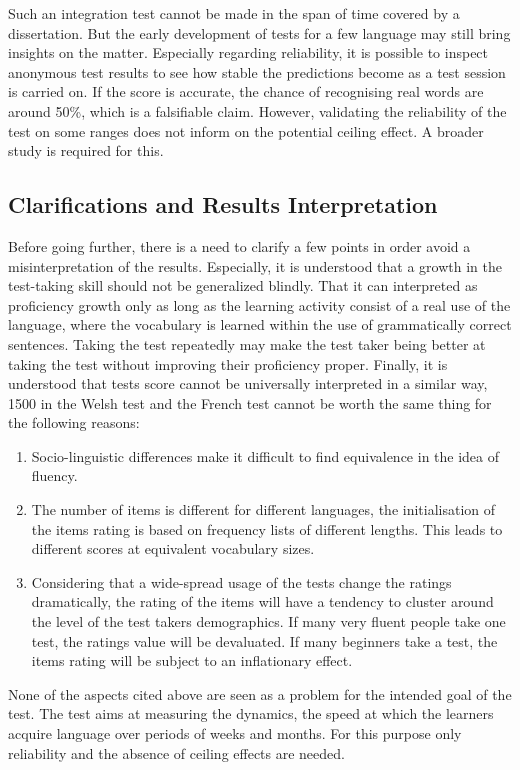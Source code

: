 Such an integration test cannot be made in the span of time covered by a dissertation. But the early development of tests for a few language may still bring insights on the matter. Especially regarding reliability, it is possible to inspect anonymous test results to see how stable the predictions become as a test session is carried on. If the score is accurate, the chance of recognising real words are around 50\%, which is a falsifiable claim. However, validating the reliability of the test on some ranges does not inform on the potential ceiling effect. A broader study is required for this.

\subsection{Clarifications and Results Interpretation}
Before going further, there is a need to clarify a few points in order avoid a misinterpretation of the results. Especially, it is understood that a growth in the test-taking skill should not be generalized blindly. That it can interpreted as proficiency growth only as long as the learning activity consist of a real use of the language, where the vocabulary is learned within the use of grammatically correct sentences. Taking the test repeatedly may make the test taker being better at taking the test without improving their proficiency proper. Finally, it is understood that tests score cannot be universally interpreted in a similar way, 1500 in the Welsh test and the French test cannot be worth the same thing for the following reasons:
\begin{enumerate}
  \item Socio-linguistic differences make it difficult to find equivalence in the idea of fluency.
  \item The number of items is different for different languages, the initialisation of the items rating is based on frequency lists of different lengths. This leads to different scores at equivalent vocabulary sizes.
  \item Considering that a wide-spread usage of the tests change the ratings dramatically, the rating of the items will have a tendency to cluster around the level of the test takers demographics. If many very fluent people take one test, the ratings value will be devaluated. If many beginners take a test, the items rating will be subject to an inflationary effect.
\end{enumerate}

None of the aspects cited above are seen as a problem for the intended goal of the test. The test aims at measuring the dynamics, the speed at which the learners acquire language over periods of weeks and months. For this purpose only reliability and the absence of ceiling effects are needed.

